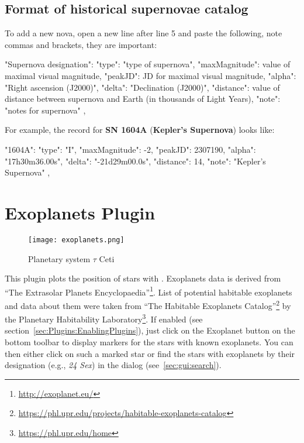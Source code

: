\newpage
\subsection{Format of historical supernovae catalog}
\label{sec:plugins:HistoricalSupernovae:format}

To add a new nova, open a new line after line 5 and paste the following, note commas and brackets, they are important:

\begin{configfile}
"Supernova designation":
{
    "type": "type of supernova",
    "maxMagnitude": value of maximal visual magnitude,
    "peakJD": JD for maximal visual magnitude,
    "alpha": "Right ascension (J2000)",
    "delta": "Declination (J2000)",
    "distance": value of distance between supernova and 
                Earth (in thousands of Light Years),
    "note": "notes for supernova"
},
\end{configfile}

\noindent For example, the record for \textbf{SN 1604A} (\textbf{Kepler's Supernova}) looks like:
\begin{configfile}
"1604A":
{
    "type": "I",
    "maxMagnitude": -2,
    "peakJD": 2307190,
    "alpha": "17h30m36.00s",
    "delta": "-21d29m00.0s",
    "distance": 14,
    "note": "Kepler's Supernova"
},
\end{configfile}

\newpage

\section{Exoplanets Plugin}
\label{sec:plugins:Exoplanets}

\begin{figure}[h]
\texttt{[image: exoplanets.png]}
\caption{Planetary system $\tau$ Ceti}
\label{fig:Exoplanets}
\end{figure}

\noindent This plugin plots the position of stars with
. Exoplanets data is derived from ``The Extrasolar Planets
Encyclopaedia''\footnote{\url{http://exoplanet.eu/}}. List of
potential habitable exoplanets and data about them were taken from
``The Habitable Exoplanets
Catalog''\footnote{\url{https://phl.upr.edu/projects/habitable-exoplanets-catalog}}
by the Planetary Habitability
Laboratory\footnote{\url{https://phl.upr.edu/home}}.  If enabled (see
section~\ref{sec:Plugins:EnablingPlugins}), just click on the
Exoplanet button  on the bottom
toolbar to display markers for the stars with known exoplanets. You
can then either click on such a marked star or find the stars with
exoplanets by their designation (e.g., \emph{24 Sex}) in the  dialog (see~\ref{sec:gui:search}).

